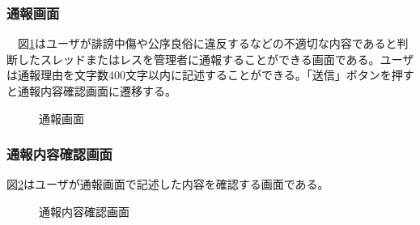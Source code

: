 \documentclass[a4j]{jarticle}
\begin{document}
\subsubsection{通報画面}
　図\ref{fig:report_reason}はユーザが誹謗中傷や公序良俗に違反するなどの不適切な内容であると判断したスレッドまたはレスを管理者に通報することができる画面である。ユーザは通報理由を文字数400文字以内に記述することができる。「送信」ボタンを押すと通報内容確認画面に遷移する。
\begin{figure}[H]
\begin{center}
\caption{通報画面}
\label{fig:report_reason}
\end{center}
\end{figure}

\subsubsection{通報内容確認画面}
図\ref{fig:report_confirm}はユーザが通報画面で記述した内容を確認する画面である。
\begin{figure}[H]
\begin{center}
\caption{通報内容確認画面}
\label{fig:report_confirm}
\end{center}
\end{figure}
\end{document}
